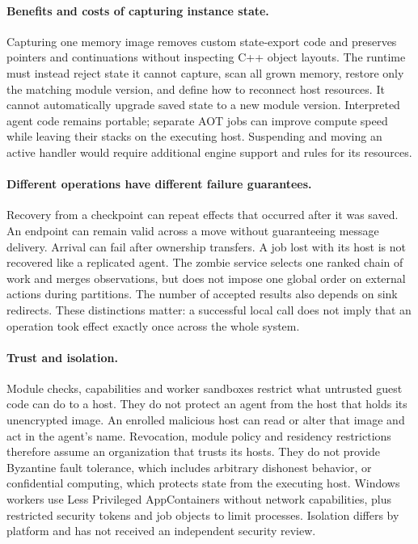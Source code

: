 
\paragraph{Benefits and costs of capturing instance state.}
Capturing one memory image removes custom state-export code and
preserves pointers and continuations without inspecting C++ object
layouts. The runtime must instead reject state it cannot capture, scan
all grown memory, restore only the matching module version, and define
how to reconnect host resources. It cannot automatically upgrade saved
state to a new module version. Interpreted agent code remains portable;
separate AOT jobs can improve compute speed while leaving their stacks
on the executing host. Suspending and moving an active handler would
require additional engine support and rules for its resources.

\paragraph{Different operations have different failure guarantees.}
Recovery from a checkpoint can repeat effects that occurred after it was
saved. An endpoint can remain valid across a move without guaranteeing
message delivery. Arrival can fail after ownership transfers. A job lost
with its host is not recovered like a replicated agent. The zombie
service selects one ranked chain of work and merges observations, but
does not impose one global order on external actions during partitions.
The number of accepted results also depends on sink redirects.
These distinctions matter: a successful local call does not imply that
an operation took effect exactly once across the whole system.

\paragraph{Trust and isolation.}\label{sec:discussion-trust}
Module checks, capabilities and worker sandboxes restrict what untrusted
guest code can do to a host. They do not protect an agent from the host
that holds its unencrypted image. An enrolled malicious host can read or
alter that image and act in the agent's name. Revocation, module policy
and residency restrictions therefore assume an organization that trusts
its hosts. They do not provide Byzantine fault tolerance, which includes
arbitrary dishonest behavior, or confidential computing, which protects
state from the executing host. Windows workers use Less Privileged
AppContainers without network capabilities, plus restricted security
tokens and job objects to limit processes. Isolation differs by platform
and has not received an independent security review.

